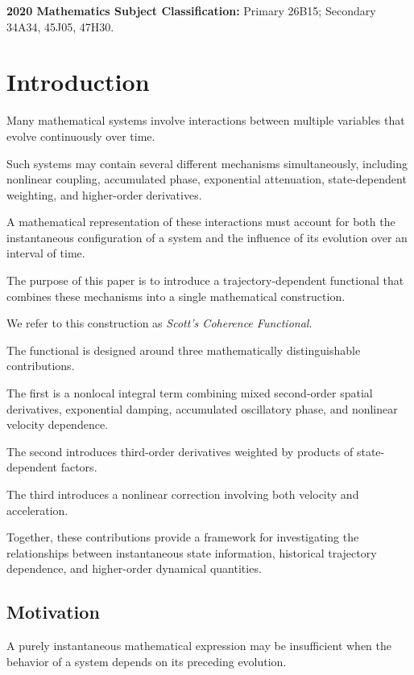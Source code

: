 \documentclass[12pt]{article}
\numberwithin{equation}{section}
\theoremstyle{definition}
\theoremstyle{remark}
\begin{document}
\medskip

\noindent\textbf{2020 Mathematics Subject Classification:}
Primary 26B15; Secondary 34A34, 45J05, 47H30.

\newpage

\tableofcontents

\newpage


\section{Introduction}

Many mathematical systems involve interactions
between multiple variables that evolve continuously
over time.

Such systems may contain several different
mechanisms simultaneously, including nonlinear
coupling, accumulated phase, exponential
attenuation, state-dependent weighting, and
higher-order derivatives.

A mathematical representation of these
interactions must account for both the instantaneous
configuration of a system and the influence of
its evolution over an interval of time.

The purpose of this paper is to introduce a
trajectory-dependent functional that combines
these mechanisms into a single mathematical
construction.

We refer to this construction as
\textit{Scott's Coherence Functional}.

The functional is designed around three
mathematically distinguishable contributions.

The first is a nonlocal integral term combining
mixed second-order spatial derivatives,
exponential damping, accumulated oscillatory
phase, and nonlinear velocity dependence.

The second introduces third-order derivatives
weighted by products of state-dependent factors.

The third introduces a nonlinear correction
involving both velocity and acceleration.

Together, these contributions provide a
framework for investigating the relationships
between instantaneous state information,
historical trajectory dependence, and
higher-order dynamical quantities.

\subsection{Motivation}

A purely instantaneous mathematical expression
may be insufficient when the behavior of a
system depends on its preceding evolution.
\end{document}
